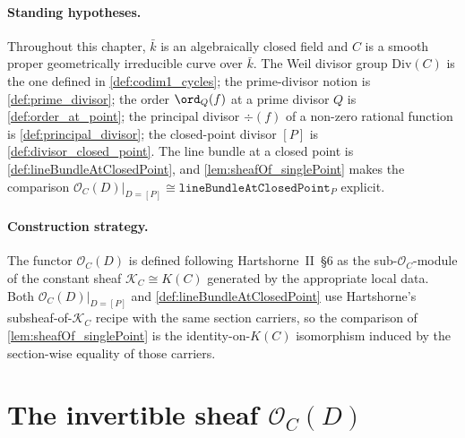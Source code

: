 \paragraph{Standing hypotheses.} Throughout this chapter, \(\bar k\) is an
algebraically closed field and \(C\) is a smooth proper geometrically
irreducible curve over \(\bar k\). The Weil divisor group
\(\mathrm{Div}(C)\) is the one defined in \cref{def:codim1_cycles}; the
prime-divisor notion is \cref{def:prime_divisor}; the order
\(\ord_Q(f)\) at a prime divisor \(Q\) is \cref{def:order_at_point}; the
principal divisor \(\div(f)\) of a non-zero rational function is
\cref{def:principal_divisor}; the closed-point divisor \([P]\) is
\cref{def:divisor_closed_point}. The line bundle at a closed point is
\cref{def:lineBundleAtClosedPoint}, and \cref{lem:sheafOf_singlePoint}
makes the comparison
\(\mathcal O_C(D)|_{D = [P]} \cong \texttt{lineBundleAtClosedPoint}_P\)
explicit.

\paragraph{Construction strategy.}
The functor \(\mathcal O_C(D)\) is defined following Hartshorne~II~\S6 as
the sub-\(\mathcal O_C\)-module of the constant sheaf
\(\mathcal K_C \cong K(C)\) generated by the appropriate local data. Both
\(\mathcal O_C(D)|_{D=[P]}\) and \cref{def:lineBundleAtClosedPoint}
use Hartshorne's subsheaf-of-\(\mathcal K_C\) recipe with the same section
carriers, so the comparison of \cref{lem:sheafOf_singlePoint} is the
identity-on-\(K(C)\) isomorphism induced by the section-wise equality of
those carriers.

\section{The invertible sheaf \(\mathcal O_C(D)\)}

